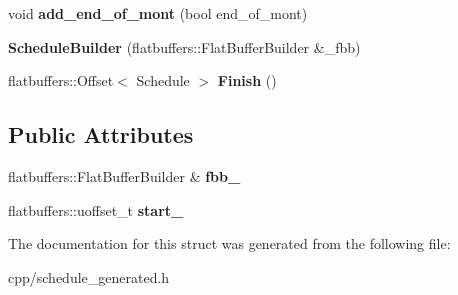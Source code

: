\begin{DoxyCompactItemize}
void {\bfseries add\+\_\+end\+\_\+of\+\_\+mont} (bool end\+\_\+of\+\_\+mont)
\item 
\mbox{\label{structquantra_1_1ScheduleBuilder_a35ef4c26b03ed89318271f91b0827814}} 
{\bfseries Schedule\+Builder} (flatbuffers\+::\+Flat\+Buffer\+Builder \&\+\_\+fbb)
\item 
\mbox{\label{structquantra_1_1ScheduleBuilder_af6313021521e6817945c50442b8e04ce}} 
flatbuffers\+::\+Offset$<$ Schedule $>$ {\bfseries Finish} ()
\end{DoxyCompactItemize}
\subsection*{Public Attributes}
\begin{DoxyCompactItemize}
\item 
\mbox{\label{structquantra_1_1ScheduleBuilder_a9cee5284a459c7926017b527d48beb4c}} 
flatbuffers\+::\+Flat\+Buffer\+Builder \& {\bfseries fbb\+\_\+}
\item 
\mbox{\label{structquantra_1_1ScheduleBuilder_adec94a1e81569b5b6d6f96bc25ba840d}} 
flatbuffers\+::uoffset\+\_\+t {\bfseries start\+\_\+}
\end{DoxyCompactItemize}


The documentation for this struct was generated from the following file\+:\begin{DoxyCompactItemize}
\item 
cpp/schedule\+\_\+generated.\+h\end{DoxyCompactItemize}
